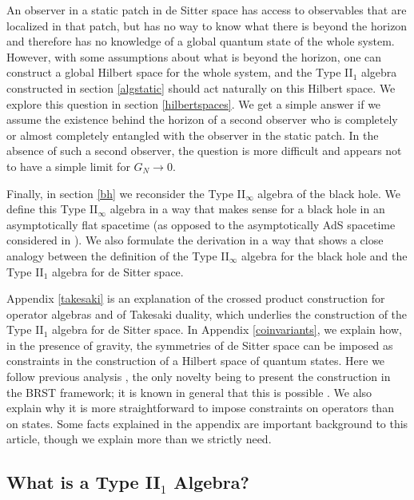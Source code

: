 \documentclass[11pt,a4paper]{article}
\begin{document}
  An observer in a static patch in de Sitter space has access to observables that are localized in that patch, but has no way to know what there is beyond the
  horizon and therefore has no knowledge of a global quantum state of the whole system.   However, with some assumptions about what is beyond the horizon,
  one can construct a global Hilbert space for the whole system, and the Type II$_1$ algebra 
  constructed in section \ref{algstatic} should act naturally on this Hilbert space.     We explore this question in section \ref{hilbertspaces}.   We get a simple answer if
  we assume the existence behind the horizon of a second observer who is completely or almost completely entangled with the observer in the static patch.  
  In the absence of such a second observer, the question is more difficult and appears not to have a simple limit for $G_N\to 0$.   
  
  Finally, in section \ref{bh} we reconsider the Type II$_\infty$ algebra of the black hole.   We define this Type II$_\infty$ algebra in a way that makes
  sense for a black hole in an asymptotically flat spacetime (as opposed to the asymptotically AdS spacetime considered in \cite{GCP}).   We also formulate
  the derivation in a way that shows a close analogy between the definition of the Type II$_\infty$ algebra for the black hole and the Type II$_1$ algebra
  for de Sitter space.   
  
  Appendix \ref{takesaki} is an explanation of the crossed product construction for operator algebras and of 
  Takesaki duality, which underlies the construction of the Type II$_1$ algebra for de Sitter space. 
  In Appendix \ref{coinvariants}, we explain how, in the presence of gravity,
   the symmetries of de Sitter space can be imposed as constraints in the construction of a Hilbert space of quantum states.  Here we follow previous
   analysis \cite{higuchi,marolf}, the only novelty being to present the construction in the BRST framework; it is known in general that this is possible
   \cite{shvedov}.   We also explain why it is more straightforward to impose constraints on operators than on states.  Some facts explained in the appendix
   are important background to this article, though  we explain more than we strictly need.  
  
  
  
  
  
 
 
 
 
 


\subsection{What is a Type II$_1$ Algebra?}\label{whatis}
\end{document}
